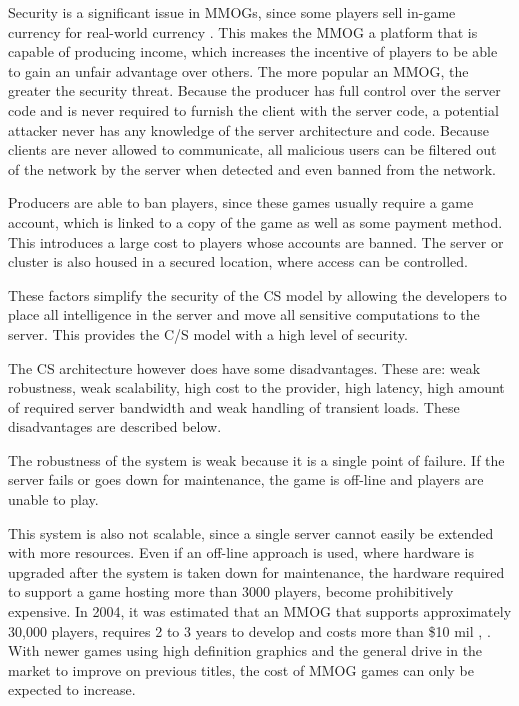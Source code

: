\documentclass[10pt,a4paper,journal,cspaper,compsoc]{IEEEtran}
\begin{document}
Security is a significant issue in MMOGs, since some players sell in-game currency for real-world currency \cite{chinese_gold_farmer}. This makes the
MMOG a platform that is capable of producing income, which increases the incentive of players to be able to gain an unfair advantage over others. The
more popular an MMOG, the greater the security threat. Because the producer has full control over the server code and is never required to furnish
the client with the server code, a potential attacker never has any knowledge of the server architecture and code. Because clients are never allowed
to communicate, all malicious users can be filtered out of the network by the server when detected and even banned from the network.

Producers are able to ban players, since these games usually require a game account, which is linked to a copy of the game as well as some payment
method. This introduces a large cost to players whose accounts are banned. The server or cluster is also housed in a secured location, where access
can be controlled.

These factors simplify the security of the \ac{CS} model by allowing the developers to place all intelligence in the server and move all sensitive
computations to the server. This provides the C/S model with a high level of security.

The \ac{CS} architecture however does have some disadvantages. These are: weak robustness, weak scalability, high cost to the provider, high latency,
high amount of required server bandwidth and weak handling of transient loads. These disadvantages are described below.

The robustness of the system is weak because it is a single point of failure. If the server fails or goes down for maintenance, the game is off-line
and players are unable to play.

This system is also not scalable, since a single server cannot easily be extended with more resources. Even if an off-line approach is used, where
hardware is upgraded after the system is taken down for maintenance, the hardware required to support a game hosting more than 3000 players, become
prohibitively expensive. In 2004, it was estimated that an MMOG that supports approximately 30,000 players, requires 2 to 3 years to develop and
costs more than \$10 mil \cite{cs_mmog_cost}, \cite{igda_online_whitepaper}. With newer games using high definition graphics and the general drive in
the market to improve on previous titles, the cost of MMOG games can only be expected to increase.
\end{document}

